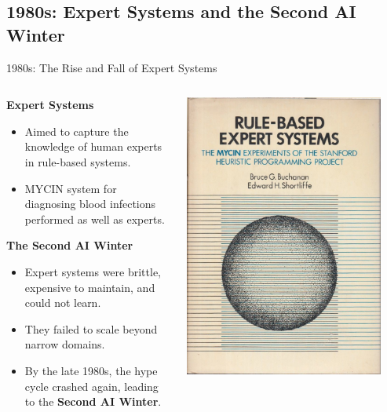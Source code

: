 \documentclass{beamer}
\begin{document}
\subsection{1980s: Expert Systems and the Second AI Winter}

\begin{frame}[t]{1980s: The Rise and Fall of Expert Systems}
\begin{columns}
    \begin{column}{0.6\textwidth}
        \textbf{Expert Systems}
        \begin{itemize}
            \item Aimed to capture the knowledge of human experts in rule-based systems.
            \item MYCIN system for diagnosing blood infections performed as well as experts.
        \end{itemize}
        \textbf{The Second AI Winter}
        \begin{itemize}
            \item Expert systems were \alert{brittle}, expensive to maintain, and could not learn.
            \item They failed to scale beyond narrow domains.
            \item By the late 1980s, the hype cycle crashed again, leading to the \textbf{Second AI Winter}.
        \end{itemize}
    \end{column}
    \begin{column}{0.4\textwidth}
        \includegraphics[width=0.9\textwidth]{images/mycin.jpg}

\end{column}
\end{columns}
\end{frame}
\end{document}
